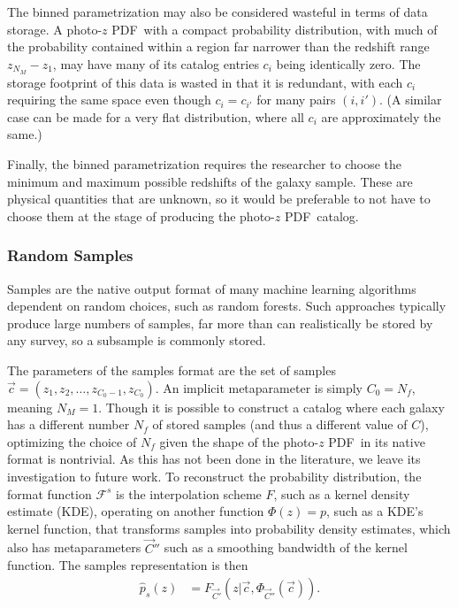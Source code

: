 \documentclass[\docopts]{\docclass}
\newcommand{\pz}{photo-$z$ PDF}
\begin{document}
The binned parametrization may also be considered wasteful in terms of data 
storage.  A \pz\ with a compact probability distribution, with much of the 
probability contained within a region far narrower than the redshift range 
$z_{N_{M}} - z_{1}$, may have many of its catalog entries $c_{i}$ being 
identically zero.  The storage footprint of this data is wasted in that it is 
redundant, with each $c_{i}$ requiring the same space even though 
$c_{i}=c_{i'}$ for many pairs $(i, i')$.  (A similar case can be made for a 
very flat distribution, where all $c_{i}$ are approximately the same.)

Finally, the binned parametrization requires the researcher to choose the 
minimum and maximum possible redshifts of the galaxy sample.  These are 
physical quantities that are unknown, so it would be preferable to not have to 
choose them at the stage of producing the \pz\ catalog.

\subsubsection{Random Samples}
\label{sec:samples}

Samples are the native output format of many machine learning algorithms 
dependent on random choices, such as random forests.
Such approaches typically produce large numbers of samples, far more than can 
realistically be stored by any survey, so a subsample is commonly stored.

The parameters of the samples format are the set of samples $\vec{c}=(z_{1}, 
z_{2}, \dots, z_{C_{0}-1}, z_{C_{0}})$.  An implicit metaparameter is simply 
$C_{0}=N_{f}$, meaning $N_{M}=1$.  Though it is possible to construct a catalog 
where each galaxy has a different number $N_{f}$ of stored samples (and thus a 
different value of $C$), optimizing the choice of $N_{f}$ given the shape of 
the \pz\ in its native format is nontrivial.  As this has not been done in the 
literature, we leave its investigation to future work.  To reconstruct the 
probability distribution, the format function $\mathcal{F}^{s}$ is the 
interpolation scheme $F$, such as a kernel density estimate (KDE), operating on 
another function $\Phi(z)=p$, such as a KDE's kernel function, that transforms 
samples into probability density estimates, which also has metaparameters 
$\vec{C}''$ such as a smoothing bandwidth of the kernel function.  The samples 
representation is then
\begin{align}
  \label{eq:sampled}
  \hat{p}_{s}(z) &= F_{\vec{C}'}(z | \vec{c}, \Phi_{\vec{C}''}(\vec{c})).
\end{align}
\end{document}

